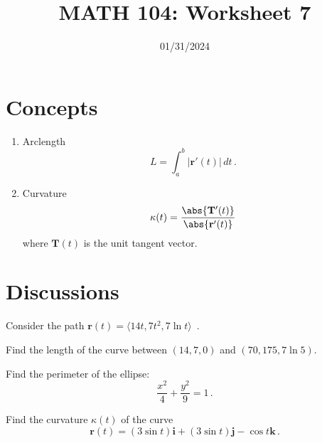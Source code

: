 \documentclass[12pt]{amsart}
\title{ MATH 104: Worksheet 7}
\author{}
\date{01/31/2024}
\begin{document}
\maketitle

\section{Concepts}

\begin{enumerate}
	\item Arclength
	      $$ L = \int_a^b \left| \mathbf{r}'(t) \right| \, dt \,. $$
	\item Curvature
	      $$ \kappa (t) = \frac{ \abs{\mathbf{T}'(t)} }{ \abs{\mathbf{r}'(t)}} $$
	      where $\mathbf{T}(t)$ is the unit tangent vector.
\end{enumerate}

\section{Discussions}

\begin{question}
	Consider the path $\mathbf{r}(t) = \langle 14t, 7t^2 , 7\ln t \rangle $  \,.

	Find the length of the curve between $(14,7,0)$ and $(70, 175, 7\ln 5)$.
\end{question}
\vspace{7cm}

\begin{question}
	Find the perimeter of the ellipse:
	\begin{equation*}
		\frac{x^2}{4} + \frac{y^2}{9} = 1 \,.
	\end{equation*}
\end{question}

\vspace{7cm}

\begin{question}
	Find the curvature $\kappa(t)$ of the curve
	\begin{equation*}
		\mathbf{r}(t) = (3 \sin t)\mathbf{i} + (3\sin t)\mathbf{j} - \cos t \mathbf{k}\,.
	\end{equation*}
\end{question}

\vspace{7cm}
\end{document}
